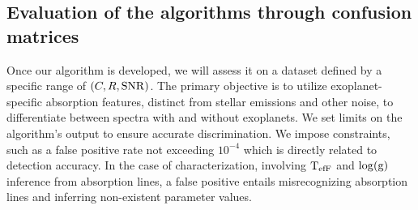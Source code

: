 \subsection{ Evaluation of the algorithms through confusion matrices}
Once our algorithm is developed, we will assess it on a dataset defined by a specific range of $\left (C, R, \rm{SNR}\right)$. The primary objective is to utilize exoplanet-specific absorption features, distinct from stellar emissions and other noise, to differentiate between spectra with and without exoplanets. 
We set limits on the algorithm's output to ensure accurate discrimination. We impose constraints, such as a false positive rate not exceeding $10^{-4}$ which is directly related to detection accuracy. In the case of characterization, involving $\rm{T_{efF}}$ and $\rm{\log(g)}$ inference from absorption lines, a false positive entails misrecognizing absorption lines and inferring non-existent parameter values.

